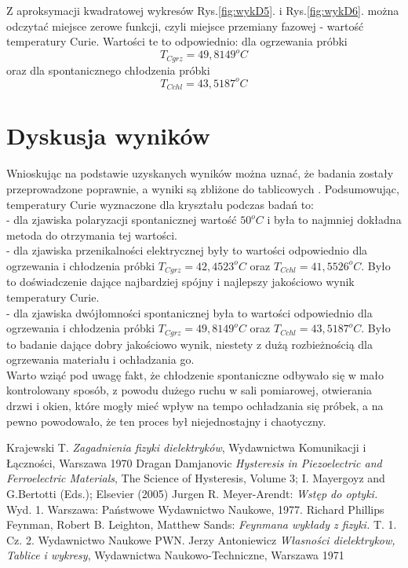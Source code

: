 \documentclass{article}
\begin{document}
Z aproksymacji kwadratowej wykresów Rys.\ref{fig:wykD5}. i Rys.\ref{fig:wykD6}. można odczytać miejsce zerowe funkcji, czyli miejsce przemiany fazowej - wartość temperatury Curie. Wartości te to odpowiednio: dla ogrzewania próbki
\begin{equation}
T_{C grz}=49,8149^{o}C
\end{equation}
oraz dla spontanicznego chłodzenia próbki
\begin{equation}
T_{C chl}=43,5187^{o}C
\end{equation}

\section{Dyskusja wyników}
Wnioskując na podstawie uzyskanych wyników można uznać, że badania zostały przeprowadzone poprawnie, a wyniki są zbliżone do tablicowych \cite{antoniewicz}. Podsumowując, temperatury Curie wyznaczone dla kryształu podczas badań to:\\
- dla zjawiska polaryzacji spontanicznej wartość $50^{o}C$ i była to najmniej dokładna metoda do otrzymania tej wartości.\\
- dla zjawiska przenikalności elektrycznej były to wartości odpowiednio dla ogrzewania i chłodzenia próbki $T_{C grz}=42,4523^{o}C$ oraz $T_{C chl}=41,5526^{o}C$. Było to doświadczenie dające najbardziej spójny i najlepszy jakościowo wynik temperatury Curie.\\
- dla zjawiska dwójłomności spontanicznej była to wartości odpowiednio dla ogrzewania i chłodzenia próbki $T_{C grz}=49,8149^{o}C$ oraz $T_{C chl}=43,5187^{o}C$. Było to badanie dające dobry jakościowo wynik, niestety z dużą rozbieżnością dla ogrzewania materiału i ochładzania go.\\
Warto wziąć pod uwagę fakt, że chłodzenie spontaniczne odbywało się w mało kontrolowany sposób, z powodu dużego ruchu w sali pomiarowej, otwierania drzwi i okien, które mogły mieć wpływ na tempo ochładzania się próbek, a na pewno powodowało, że ten proces był niejednostajny i chaotyczny.

\begin{thebibliography}{99}
	 Krajewski T. \textit{Zagadnienia fizyki dielektryków}, Wydawnictwa Komunikacji i Łączności, Warszawa 1970 
	Dragan Damjanovic \textit{Hysteresis in Piezoelectric
and Ferroelectric Materials}, The Science of Hysteresis, Volume 3; I. Mayergoyz and G.Bertotti (Eds.); Elsevier (2005)
	 Jurgen R. Meyer-Arendt: \textit{Wstęp do optyki.} Wyd. 1. Warszawa: Państwowe Wydawnictwo Naukowe, 1977.
	 Richard Phillips Feynman, Robert B. Leighton, Matthew Sands: \textit{Feynmana wykłady z fizyki.} T. 1. Cz. 2. Wydawnictwo Naukowe PWN.
	 Jerzy Antoniewicz \textit{Własności dielektrykow, Tablice i wykresy}, Wydawnictwa Naukowo-Techniczne, Warszawa 1971
\end{thebibliography}
\end{document}
